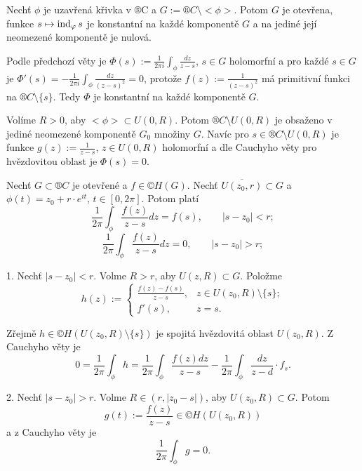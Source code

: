 \documentclass[12pt]{article}					%
\begin{document}
\begin{veta}
	Nechť $\phi$ je uzavřená křivka v ®C a $G := ®C \setminus <\phi>$. Potom $G$ je otevřena, funkce $s \mapsto \operatorname{ind}_\varphi s$ je konstantní na každé komponentě $G$ a na jediné její neomezené komponentě je nulová.

	\begin{dukazin}
		Podle předchozí věty je $\Phi(s) := \frac{1}{2 \pi i} \int_\phi \frac{dz}{z - s}$, $s \in G$ holomorfní a pro každé $s \in G$ je $\Phi'(s) = -\frac{1}{2\pi i} \int_\phi \frac{dz}{(z - s)^2} = 0$, protože $f(z) := \frac{1}{(z - s)^2}$ má primitivní funkci na $®C \setminus \{s\}$. Tedy $\Phi$ je konstantní na každé komponentě $G$.

		Volíme $R > 0$, aby $<\phi> \subset U(0, R)$. Potom $®C \setminus U(0, R)$ je obsaženo v jediné neomezené komponentě $G_0$ množiny $G$. Navíc pro $s \in ®C \setminus U(0, R)$ je funkce $g(z) := \frac{1}{z - s}$, $z \in U(0, R)$ holomorfní a dle Cauchyho věty pro hvězdovitou oblast je $\Phi(s) = 0$.
	\end{dukazin}
\end{veta}


\begin{veta}
	Nechť $G \subset ®C$ je otevřené a $f \in ©H(G)$. Nechť $\overline{U(z_0, r)} \subset G$ a $\phi(t) = z_0 + r·e^{it}$, $t \in [0, 2\pi]$. Potom platí
	$$ \frac{1}{2\pi} \int_\phi \frac{f(z)}{z - s} dz = f(s), \qquad |s - z_0| < r; $$
	$$ \frac{1}{2\pi} \int_\phi \frac{f(z)}{z - s} dz = 0, \qquad |s - z_0| > r; $$

	\begin{dukazin}
		1. Nechť $|s - z_0|<r$. Volme $R > r$, aby $U(z, R) \subset G$. Položme
		$$ h(z) := \begin{cases}\frac{f(z) - f(s)}{z - s},& z \in U(z_0, R) \setminus \{s\};\\f'(s),& z = s. \end{cases} $$
		
		Zřejmě $h \in ©H(U(z_0, R) \setminus \{s\})$ je spojitá hvězdovitá oblast $U(z_0, R)$. Z Cauchyho věty je
		$$ 0 = \frac{1}{2\pi} \int_\phi h = \frac{1}{2\pi} \int_\phi \frac{f(z) dz}{z - s} - \frac{1}{2\pi} \int_\phi \frac{dz}{z - d}·f_s. $$

		2. Nechť $|s - z_0| > r$. Volme $R \in (r, |z_0 - s|)$, aby $U(z_0, R) \subset G$. Potom
		$$ g(t) := \frac{f(z)}{z - s} \in ©H(U(z_0, R)) $$
		a z Cauchyho věty je
		$$ \frac{1}{2\pi} \int_\phi g = 0. $$
	\end{dukazin}
\end{veta}
\end{document}
